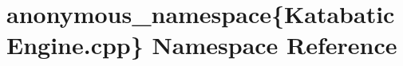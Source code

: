 \hypertarget{namespaceanonymous__namespace_02KatabaticEngine_8cpp_03}{\section{anonymous\-\_\-namespace\{Katabatic\-Engine.\-cpp\} Namespace Reference}
\label{namespaceanonymous__namespace_02KatabaticEngine_8cpp_03}
}
